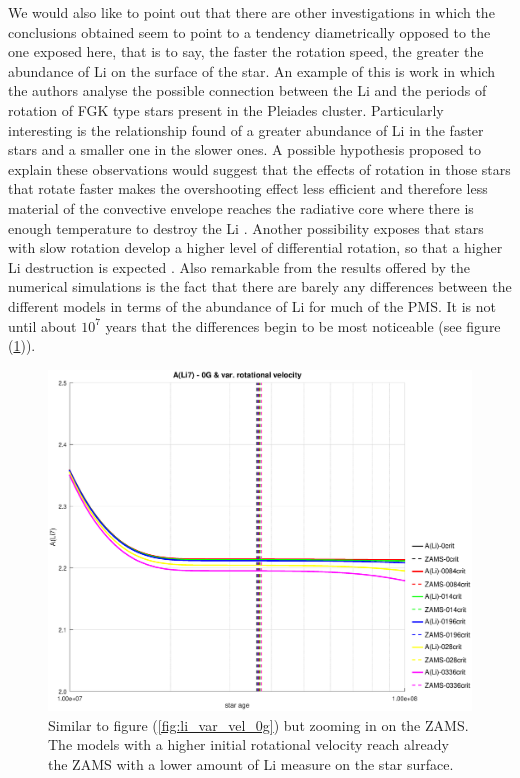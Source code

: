 \documentclass[fleqn,usenatbib]{mnras}
\begin{document}
We would also like to point out that there are other investigations in which the conclusions obtained seem to point to a tendency diametrically opposed to the one exposed here, that is to say, the faster the rotation speed, the greater the abundance of Li on the surface of the star. An example of this is \citet{Bouvier2018} work in which the authors analyse the possible connection between the Li and the periods of rotation of FGK type stars present in the Pleiades cluster. Particularly interesting is the relationship found of a greater abundance of Li in the faster stars and a smaller one in the slower ones. A possible hypothesis proposed to explain these observations would suggest that the effects of rotation in those stars that rotate faster makes the overshooting effect less efficient and therefore less material of the convective envelope reaches the radiative core where there is enough temperature to destroy the Li \citep{Baraffe2017}. Another possibility exposes that stars with slow rotation develop a higher level of differential rotation, so that a higher Li destruction is expected \citep{Bouvier2008}. Also remarkable from the results offered by the numerical simulations is the fact that there are barely any differences between the different models in terms of the abundance of Li for much of the PMS. It is not until about $10^7$ years that the differences begin to be most noticeable (see figure (\ref{fig:li_var_vel_0g_z1})).\par

\begin{figure}
	\includegraphics[trim = 40mm 15mm 20mm 15mm, clip,width=\columnwidth]{figures/li_var_vel_0_0g_z1.eps}
    \caption {Similar to figure (\ref{fig:li_var_vel_0g}) but zooming in on the ZAMS. The models with a higher initial rotational velocity reach already the ZAMS with a lower amount of Li measure on the star surface.}
    \label{fig:li_var_vel_0g_z1}
\end{figure}
\end{document}
